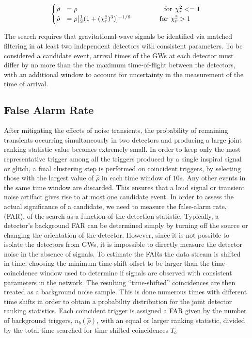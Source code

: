 \documentclass[binding=0.6cm, LaM]{sapthesis}
\begin{document}
		\begin{equation}
		\begin{cases}
			\hat \rho &= \rho \hspace*{4.5cm}  \text{for} \hspace*{0.15cm}\chi^2_r <= 1 \\
			\hat \rho &= \rho[{1 \over 2} (1 + (\chi^2_r)^3)]^{-1/6}  \hspace*{1.5cm}  \text{for} \hspace*{0.15cm} \chi^2_r > 1
		\end{cases}
		\end{equation}

	The search requires that gravitational-wave signals be identified via matched filtering 
	in at least two independent detectors with consistent parameters. 
	To be considered a candidate event, arrival times of the GWs at each detector 
	must differ by no more than the the maximum time-of-flight between the detectors, 
	with an additional window to account for uncertainty in the measurement of the time of arrival.
 
\subsection{False Alarm Rate}

	After mitigating the effects of noise transients, the probability of remaining transients 
	occurring simultaneously in two detectors and producing a large joint 
	ranking statistic value becomes extremely small.
	In order to keep only the most representative trigger among all the triggers produced by a single inspiral signal or glitch, 
	a final clustering step is performed on coincident triggers, 
	by selecting those with the largest value of $\hat \rho$ 
	in each time window of $10s$. 
	Any other events in the same time window are discarded. 
	This ensures that a loud signal or transient noise artifact gives rise to at most one candidate event.
	In order to assess the actual significance of a candidate, 
	we need to measure the false-alarm rate, (FAR), of the search as a function of the detection statistic.
	Typically, a detector’s background FAR can be determined 
	simply by turning off the source or changing the orientation of the detector. 
  	However, since it is not possible to isolate the detectors from GWs, 
	it is impossible to directly measure the detector noise in the absence of signals.
 	To estimate the FARs the data stream is shifted in time, 
	choosing the minimum time-shift offset to be larger than the time-coincidence window 
	used to determine if signals are observed with consistent parameters in the network.
	The resulting “time-shifted” coincidences are then treated as a background noise sample. 
	This is done numerous times with different time shifts in order to obtain 
	a probability distribution for the joint detector ranking statistics. 
	Each coincident trigger is assigned a FAR given by the number 
	of background triggers, $n_b(\hat \rho)$, with an equal or larger ranking statistic, 
	divided by the total time searched for time-shifted coincidences $T_b$
		
\end{document}
